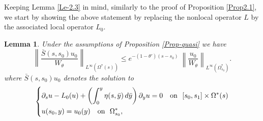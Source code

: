 \documentclass[12pt]{amsart}
\numberwithin{equation}{section}
\numberwithin{equation}{section}
\newtheorem{lem}[thm]{Lemma}
\begin{document}
 Keeping  Lemma \ref{Le-2.3} in mind,   similarly to the proof of  Proposition \ref{Prop2.1}, we start by showing the above statement by replacing the nonlocal operator $L$ by the associated  local operator $L_0.$     
   
   
   \begin{lem} \label{Le-quasi}
Under the assumptions of Proposition \ref{Prop-quasi} we have
$$
\left\|\frac{\bar{S}(s,s_0)u_0}{W_\theta}\right\|_{L^\infty{(\Omega^*(s))}}\leq  e^{-(1-\theta')(s-s_0)}~
 \left\|\frac{u_0}{W_\theta}\right\|_{L^\infty{(\Omega^*_{s_0})}}.
$$
where $\bar S(s,s_0)u_0$ denotes the solution to
$$
\left\{\begin{aligned} 
&\partial_s u - L_0 (u) + \left(\int_{0}^y \eta(s,\bar y) \,d\bar y\right) \partial_y u =0\quad{\rm on}~~ [s_0,s_1]\times \Omega^*(s)\\
&u(s_0, y)=u_0(y)\quad{\rm on}~~   \Omega^*_{s_0},
\end{aligned}\right.
$$

\end{lem}
   
\end{document}

